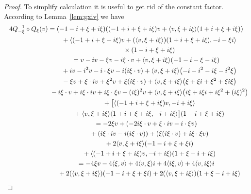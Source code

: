 \documentclass[10pt,a4paper]{amsart}
\numberwithin{equation}{section}
\begin{document}
\begin{proof}
 To simplify calculation it is useful to get rid of the constant factor. According to Lemma~\ref{lem:gxiv} we have
 \begin{gather*}
 4 Q_{-\xi}^{-1}\circ Q_\xi(v) = (-1-i+\xi+i\xi) ((-1+i+\xi+i\xi) v + \langle v, \xi + i\xi \rangle (1+i+\xi+i\xi) ) \\
\hphantom{4 Q_{-\xi}^{-1}\circ Q_\xi(v) =}{} + \langle (-1+i+\xi+i\xi) v + (\langle v, \xi + i\xi \rangle )(1+i+\xi+i\xi), -i - \xi i \rangle \\
\hphantom{4 Q_{-\xi}^{-1}\circ Q_\xi(v) =}{} \times (1-i+\xi+i\xi)\\
\hphantom{4 Q_{-\xi}^{-1}\circ Q_\xi(v)}{} = v-iv-\xi v-i\xi\cdot v+ \langle v, \xi + i\xi \rangle(-1-i-\xi-i\xi)\\
\hphantom{4 Q_{-\xi}^{-1}\circ Q_\xi(v) =}{} +iv-i^2v-i\cdot \xi v-i(i\xi\cdot v)+\langle v, \xi + i\xi \rangle\big({-}i-i^2-i\xi -i^2\xi\big)\\
\hphantom{4 Q_{-\xi}^{-1}\circ Q_\xi(v) =}{} -\xi v+\xi \cdot iv+\xi^2v+\xi (i\xi \cdot v)+\langle v, \xi + i\xi \rangle \big(\xi +\xi i+\xi^2+\xi i\xi\big)\\
\hphantom{4 Q_{-\xi}^{-1}\circ Q_\xi(v) =}{} -i\xi\cdot v+i\xi\cdot iv+i\xi\cdot \xi v+(i\xi)^2 v+ \langle v, \xi + i\xi \rangle \big(i\xi+i\xi i+i\xi^2+(i\xi)^2\big)\\
\hphantom{4 Q_{-\xi}^{-1}\circ Q_\xi(v) =}{} +\big[ \langle (-1+i+\xi+i\xi)v, -i+i\xi \rangle \\
 \hphantom{4 Q_{-\xi}^{-1}\circ Q_\xi(v) =}{} + \langle v, \xi + i\xi \rangle \langle 1+i+\xi+i\xi ,-i+i\xi\rangle \big] (1-i+\xi+i\xi)\\
\hphantom{4 Q_{-\xi}^{-1}\circ Q_\xi(v)}{} = -2\xi v+(-2 i\xi\cdot v+\xi\cdot iv-i\cdot \xi v) \\
\hphantom{4 Q_{-\xi}^{-1}\circ Q_\xi(v) =}{} +(i\xi \cdot iv-i(i\xi \cdot v))+(\xi (i\xi \cdot v)+i\xi\cdot \xi v)\\
\hphantom{4 Q_{-\xi}^{-1}\circ Q_\xi(v) =}{} +2\langle v, \xi + i\xi \rangle(-1-i+\xi+\xi i) \\
\hphantom{4 Q_{-\xi}^{-1}\circ Q_\xi(v) =}{} +\langle (-1+i+\xi+i\xi)v, -i+i\xi \rangle(1+\xi-i+i\xi)\\
\hphantom{4 Q_{-\xi}^{-1}\circ Q_\xi(v)}{} =-4\xi v-4\langle \xi,v\rangle+4\langle v, \xi \rangle i+4\langle i\xi,v \rangle+4 \langle v, i\xi \rangle i\\
\hphantom{4 Q_{-\xi}^{-1}\circ Q_\xi(v) =}{} +2(\langle v, \xi + i\xi \rangle)(-1-i+\xi+\xi i)+2(\langle v, \xi + i\xi \rangle)(1+\xi-i+i\xi )\\

\end{gather*}
\end{proof}
\end{document}
